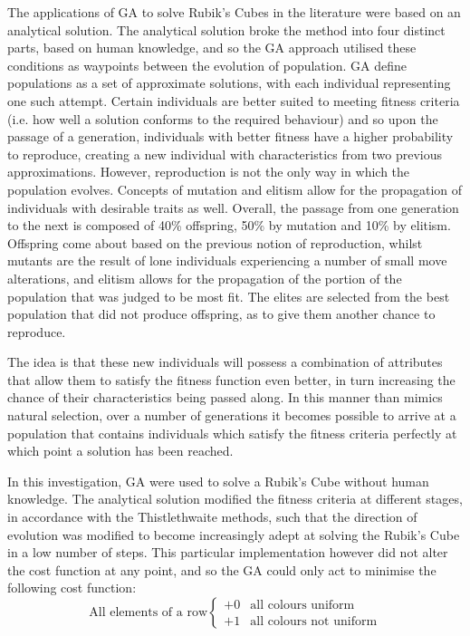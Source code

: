 \documentclass[UKenglish]{svproc}
\begin{document}
The applications of GA to solve Rubik's Cubes in the literature were based on an analytical solution. The analytical solution broke the method into four distinct parts, based on human knowledge, and so the GA approach utilised these conditions as waypoints between the evolution of population. GA define populations as a set of approximate solutions, with each individual representing one such attempt. Certain individuals are better suited to meeting fitness criteria (i.e. how well a solution conforms to the required behaviour) and so upon the passage of a generation, individuals with better fitness have a higher probability to reproduce, creating a new individual with characteristics from two previous approximations. However, reproduction is not the only way in which the population evolves. Concepts of mutation and elitism allow for the propagation of individuals with desirable traits as well. Overall, the passage from one generation to the next is composed of 40\% offspring, 50\% by mutation and 10\% by elitism. Offspring come about based on the previous notion of reproduction, whilst mutants are the result of lone individuals experiencing a number of small move alterations, and elitism allows for the propagation of the portion of the population that was judged to be most fit. The elites are selected from the best population that did not produce offspring, as to give them another chance to reproduce. \par The idea is that these new individuals will possess a combination of attributes that allow them to satisfy the fitness function even better, in turn increasing the chance of their characteristics being passed along. In this manner than mimics natural selection, over a number of generations it becomes possible to arrive at a population that contains individuals which satisfy the fitness criteria perfectly at which point a solution has been reached. \par In this investigation, GA were used to solve a Rubik's Cube without human knowledge. The analytical solution modified the fitness criteria at different stages, in accordance with the Thistlethwaite methods, such that the direction of evolution was modified to become increasingly adept at solving the Rubik's Cube in a low number of steps.  This particular implementation however did not alter the cost function at any point, and so the GA could only act to minimise the following cost function:
\[
    \text{All elements of a row} 
    \begin{cases} 
      +0 & \text{all colours uniform} \\
      +1 & \text{all colours not uniform}
   \end{cases}
\]
\end{document}
